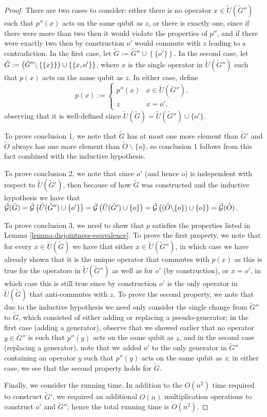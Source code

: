 \documentclass[twocolumn,showpacs,preprintnumbers,amsmath,amssymb,nofootinbib,pra,floatfix]{revtex4-1}
\newcommand{\set}{\tilde}
\newcommand{\genfun}{\tilde{\mathcal{G}}}
\begin{document}
\begin{proof}
There are two cases to consider:  either there is no operator $x\in\set U(\set G'')$ such that $p''(x)$ acts on the same qubit as $z$, or there is exactly one, since if there were more than two then it would violate the properties of $p''$, and if there were exactly two then by construction $o'$ would commute with $z$ leading to a contradiction.  In the first case, let $\set G:=\set G''\cup\left\{\{o'\}\right\}$.  In the second case, let $\set G:=\paren{\set G''\backslash\left\{\{x\}\right\}}\cup\left\{\{x,o'\}\right\}$, where $x$ is the single operator in $\set U(\set G'')$ such that $p(x)$ acts on the same qubit as $z$.   In either case, define
$$
p(x) :=
\begin{cases}
p''(x) & x\in \set U(\set G''), \\
z & x=o',
\end{cases}
$$
observing that it is well-defined since $\set U(\set G)=\set U(\set G'')\cup\{o'\}$.

To prove conclusion 1, we note that $\set G$ has at most one more element than $\set G'$ and $\set O$ always has one more element than $\set O\backslash\{o\}$, so conclusion 1 follows from this fact combined with the inductive hypothesis.

To prove conclusion 2, we note that since $o'$ (and hence $o$) is independent with respect to $\set U(\set G')$, then because of how $\set G$ was constructed and the inductive hypothesis we have that $\genfun(\set G)=\genfun\paren{\set U(\set G'')\cup\{o'\}}=\genfun\paren{\set U(\set G')\cup\{o\}}=\genfun\paren{(\set O\backslash\{o\})\cup\{o\}}=\genfun(\set O)$.

To prove conclusion 3, we need to show that $p$ satisfies the properties listed in Lemma \ref{lemma:disjointness-equvalence}.  To prove the first property, we note that for every $x\in\set U(\set G)$ we have that either $x\in\set U(\set G'')$, in which case we have already shown that it is the unique operator that commutes with $p(x)$ as this is true for the operators in $\set U(\set G'')$ as well as for $o'$ (by construction), or $x=o'$, in which case this is still true since by construction $o'$ is the only operator in $\set U(\set G)$ that anti-commutes with $z$.  To prove the second property, we note that due to the inductive hypothesis we need only consider the single change from $\set G''$ to $\set G$, which consisted of either adding or replacing a pseudo-generator;  in the first case (adding a generator), observe that we showed earlier that no operator $y\in\set G''$ is such that $p''(y)$ acts on the same qubit as $z$, and in the second case (replacing a generator), note that we added $o'$ to the only generator in $\set G''$ containing an operator $y$ such that $p''(y)$ acts on the same qubit as $z$;  in either case, we see that the second property holds for $\set G$.

Finally, we consider the running time.  In addition to the $O(n^2)$ time required to construct $\set G'$, we required an additional $O(n)$ multiplication operations to construct $o'$ and $\set G''$;  hence the total running time is $O(n^2)$.
\end{proof}
\end{document}
